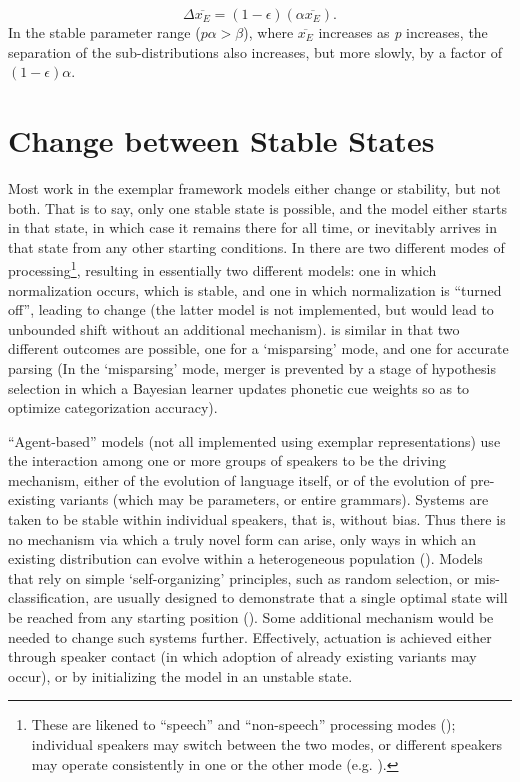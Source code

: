 \begin{equation}
\varDelta\overline{x_{E}}=(1-\epsilon)(\alpha\overline{x_{E}}).\label{eq:Cat Sep}
\end{equation}
In the stable parameter range ($p\alpha>\beta$), where $\overline{x_{E}}$
increases as \emph{p} increases, the separation of the sub-distributions
also increases, but more slowly, by a factor of $(1-\epsilon)\alpha$.

\section{\label{sec:Actuation}Change between Stable States}

Most work in the exemplar framework models either change or stability,
but not both. That is to say, only one stable state is possible, and
the model either starts in that state, in which case it remains there
for all time, or inevitably arrives in that state from any other starting
conditions. In \citet{Garrett2013} there are two different modes
of processing\footnote{These are likened to “speech” and “non-speech” processing
modes (\citealt{liberman1967perception}); individual speakers may
switch between the two modes, or different speakers may operate consistently
in one or the other mode (e.g. \citealt{yu2013socio}). }, resulting in essentially two different models: one in which normalization
occurs, which is stable, and one in which normalization is “turned
off”, leading to change (the latter model is not implemented, but
would lead to unbounded shift without an additional mechanism). \citet{Kirby2014}
is similar in that two different outcomes are possible, one for a
`misparsing' mode, and one for accurate parsing (In the `misparsing'
mode, merger is prevented by a stage of hypothesis selection in which
a Bayesian learner updates phonetic cue weights so as to optimize
categorization accuracy). 

“Agent-based” models (not all implemented using exemplar representations)
use the interaction among one or more groups of speakers to be the
driving mechanism, either of the evolution of language itself, or
of the evolution of pre-existing variants (which may be parameters,
or entire grammars). Systems are taken to be stable within individual
speakers, that is, without bias. Thus there is no mechanism via which
a truly novel form can arise, only ways in which an existing distribution
can evolve within a heterogeneous population (\citealt{Niyogi1997,Boer2000,nowak2001evolution,Steels2005,baxter2006utterance,oudeyer2006self,fagyal2010centers,stanford2013revisiting,pierrehumbert2014model}).
Models that rely on simple `self-organizing' principles, such as random
selection, or mis-classification, are usually designed to demonstrate
that a single optimal state will be reached from any starting position
(\citealp{Wedela,ettlinger2007exemplar,Wedel2006,Blevins2009,DBLP:journals/corr/Tupper14a,wedel2017category}).
Some additional mechanism would be needed to change such systems further.
Effectively, actuation is achieved either through speaker contact
(in which adoption of already existing variants may occur), or by
initializing the model in an unstable state. 

